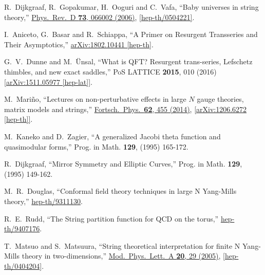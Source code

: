 \documentclass[11pt]{article}
\renewcommand{\[}{\begin{eqnarray}}
\renewcommand{\]}{\end{eqnarray}}
\begin{document}
\begin{thebibliography}{99}
  R.~Dijkgraaf, R.~Gopakumar, H.~Ooguri and C.~Vafa,
  ``Baby universes in string theory,''
  \href{http://dx.doi.org/10.1103/PhysRevD.73.066002}{Phys.\ Rev.\ D {\bf 73}, 066002 (2006)},
 \href{http://arxiv.org/abs/hep-th/0504221}{[hep-th/0504221]}.

  I.~Aniceto, G.~Basar and R.~Schiappa,
  ``A Primer on Resurgent Transseries and Their Asymptotics,''
  \href{http://arxiv.org/abs/1802.10441}{arXiv:1802.10441 [hep-th]}.

  G.~V.~Dunne and M.~\"{U}nsal,
  ``What is QFT? Resurgent trans-series, Lefschetz thimbles, and new exact saddles,''
  PoS LATTICE {\bf 2015}, 010 (2016)
 \href{http://arxiv.org/abs/1511.0597}{[arXiv:1511.05977 [hep-lat]]}.

  M.~Mari\~{n}o,
  ``Lectures on non-perturbative effects in large $N$ gauge theories, matrix models and strings,''
  \href{http://dx.doi.org/10.1002/prop.201400005}{Fortsch.\ Phys.\  {\bf 62}, 455 (2014)},
  \href{http://arxiv.org/abs/1206.6272}{[arXiv:1206.6272 [hep-th]]}.

M.~Kaneko and D.~Zagier,
``A generalized Jacobi theta function and quasimodular forms,''
Prog. in Math. {\bf 129}, (1995) 165-172.

R.~Dijkgraaf,
``Mirror Symmetry and Elliptic Curves,''
Prog. in Math. {\bf 129}, (1995) 149-162.

  M.~R.~Douglas,
  ``Conformal field theory techniques in large N Yang-Mills theory,''
  \href{http://arxiv.org/abs/hep-th/9311130}{hep-th/9311130}.

  R.~E.~Rudd,
  ``The String partition function for QCD on the torus,''
  \href{http://arxiv.org/abs/hep-th/9407176}{hep-th/9407176}.




  T.~Matsuo and S.~Matsuura,
  ``String theoretical interpretation for finite N Yang-Mills theory in two-dimensions,''
  \href{http://dx.doi.org/10.1142/S0217732305016348}{Mod.\ Phys.\ Lett.\ A {\bf 20}, 29 (2005)},
 \href{http://arxiv.org/abs/hep-th/0404204}{[hep-th/0404204]}.


\end{thebibliography}
\end{document}
